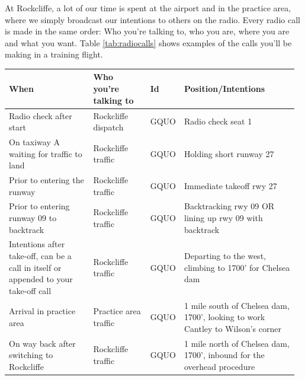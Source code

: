\documentclass[12pt,letterpaper]{article}
\begin{document}
    At Rockcliffe, a lot of our time is spent at the airport and in the practice area, where we simply broadcast our intentions to others on the radio. Every radio call is made in the same order: Who you’re talking to, who you are, where you are and what you want. Table \ref{tab:radiocalls} shows examples of the calls you’ll be making in a training flight.

    \begin{table}[]
    \hspace*{-1cm}
        \renewcommand{\arraystretch}{2.0} %
        \begin{tabular}{| p{0.30\linewidth} |  p{0.20\linewidth} | p{0.07\linewidth} |  p{0.40\linewidth} |} %
        \hline
         When & Who you're talking to & Id & Position/Intentions  \\
        \hline
     
        Radio check after start & Rockcliffe dispatch & GQUO & Radio check seat 1 \\
        \hline
        
        On taxiway A waiting for traffic to land & Rockcliffe traffic & GQUO & Holding short runway 27  \\
        \hline
        
        Prior to entering the runway & Rockcliffe traffic & GQUO & Immediate takeoff rwy 27\\
        \hline
        
        Prior to entering runway 09 to backtrack & Rockcliffe traffic & GQUO & Backtracking rwy 09 OR lining up rwy 09 with backtrack\\
        \hline

        Intentions after take-off, can be a call in itself or appended to your take-off call & Rockcliffe traffic & GQUO & Departing to the west, climbing to 1700’ for Chelsea dam\\
        \hline
        
        Arrival in practice area & Practice area traffic & GQUO & 1 mile south of Chelsea dam, 1700’, looking to work Cantley to Wilson’s corner\\
        \hline
        
        On way back after switching to Rockcliffe & Rockcliffe traffic & GQUO & 1 mile north of Chelsea dam, 1700’, inbound for the overhead procedure\\
        \hline
        

\end{tabular}
\end{table}
\end{document}

